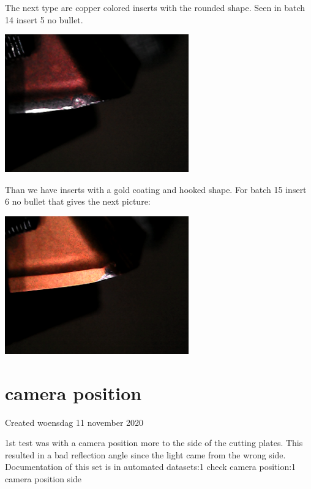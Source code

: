 The next type are copper colored inserts with the rounded shape. Seen in batch 14 insert 5 no bullet.

\includegraphics[width=3.125000in, keepaspectratio=true]{./fig/Vision/Dataset/automated_datasets/2_created_datasets/2_Spaghetti_dataset/rounded_copper_b_014_p_005_l_006-011_white_nb.png}



Than we have inserts with a gold coating and hooked shape. For batch 15 insert 6 no bullet that gives the next picture:

\includegraphics[width=3.125000in, keepaspectratio=true]{./fig/Vision/Dataset/automated_datasets/2_created_datasets/2_Spaghetti_dataset/rounded_gold_b_015_p_006_l_006-011_white_nb.png}

\section{camera position}

Created woensdag 11 november 2020



1st test was with a camera position more to the side of the cutting plates. This resulted in a bad reflection angle since the light came from the wrong side. Documentation of this set is in automated datasets:1 check camera position:1 camera position side


